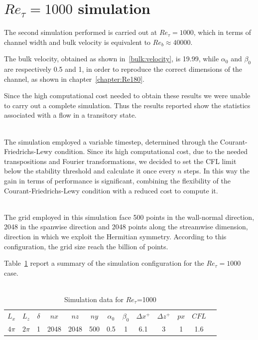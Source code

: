 \section{$Re_{\tau}=1000$ simulation} 
The second simulation performed is carried out at $Re_{\tau}=1000$, which in terms of channel width and bulk velocity is equivalent to $Re_{b}\approx40000$.\par
The bulk velocity, obtained as shown in~\ref{bulk:velocity}, is 19.99, while $\alpha_{0}$ and $\beta_{0}$ are respectively 0.5 and 1, in order to reproduce the correct dimensions of the channel, as shown in chapter~\ref{chapter:Re180}.\par
Since the high computational cost needed to obtain these results we were unable to carry out a complete simulation. Thus the results reported show the statistics associated with a flow in a transitory state. \\~\par

The simulation employed a variable timestep, determined through the Courant-Friedrichs-Lewy condition. Since its high computational cost, due to the needed transpositions and Fourier transformations, we decided to set the CFL limit below the stability threshold and calculate it once every $n$ steps. In this way the gain in terms of performance is significant, combining the flexibility of the Courant-Friedrichs-Lewy condition with a reduced cost to compute it.\\~\par

The grid employed in this simulation face 500 points in the wall-normal direction, 2048 in the spanwise direction and 2048 points along the streamwise dimension, direction in which we exploit the Hermitian symmetry. According to this configuration, the grid size reach the billion of points.\par
Table~\ref{table:1000} report a summary of the simulation configuration for the $Re_{\tau}=1000$ case.\\~\par

\begin{table}
\caption{Simulation data for $Re_{\tau}$=1000}
\begin{center}
\begin{tabular}{ccccccccccccc}
\toprule
$L_{x}$ & $L_{z}$ & $\delta$ & $nx$ & $nz$ & $ny$ & $\alpha_{0}$ & $\beta_{0}$ & $\Delta x^{+}$ & $\Delta z^{+}$ & $px$ & $CFL$\\
$4\pi$ & $2\pi$ & 1 & 2048 & 2048 & 500 & 0.5 & 1 & 6.1  & 3 & 1 & 1.6 \\
\bottomrule
\end{tabular}
\end{center}
\label{table:1000}
\end{table}


